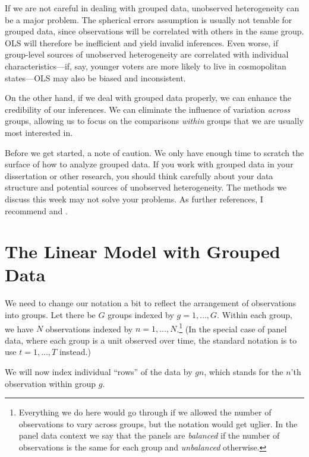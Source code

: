 \documentclass[
  12pt,
  oneside,openany]{book}
\begin{document}
If we are not careful in dealing with grouped data, unobserved heterogeneity can be a major problem. The spherical errors assumption is usually not tenable for grouped data, since observations will be correlated with others in the same group. OLS will therefore be inefficient and yield invalid inferences. Even worse, if group-level sources of unobserved heterogeneity are correlated with individual characteristics---if, say, younger voters are more likely to live in cosmopolitan states---OLS may also be biased and inconsistent.

On the other hand, if we deal with grouped data properly, we can enhance the credibility of our inferences. We can eliminate the influence of variation \emph{across} groups, allowing us to focus on the comparisons \emph{within} groups that we are usually most interested in.

Before we get started, a note of caution. We only have enough time to scratch the surface of how to analyze grouped data. If you work with grouped data in your dissertation or other research, you should think carefully about your data structure and potential sources of unobserved heterogeneity. The methods we discuss this week may not solve your problems. As further references, I recommend \citet{Wooldridge:2002vr} and \citet{gelman2006data}.

\hypertarget{the-linear-model-with-grouped-data}{%
\section{The Linear Model with Grouped Data}\label{the-linear-model-with-grouped-data}}

We need to change our notation a bit to reflect the arrangement of observations into groups. Let there be \(G\) groups indexed by \(g = 1, \ldots, G\). Within each group, we have \(N\) observations indexed by \(n = 1, \ldots, N\).\footnote{Everything we do here would go through if we allowed the number of observations to vary across groups, but the notation would get uglier. In the panel data context we say that the panels are \emph{balanced} if the number of observations is the same for each group and \emph{unbalanced} otherwise.} (In the special case of panel data, where each group is a unit observed over time, the standard notation is to use \(t = 1, \ldots, T\) instead.)

We will now index individual ``rows'' of the data by \(gn\), which stands for the \(n\)'th observation within group \(g\).
\end{document}
